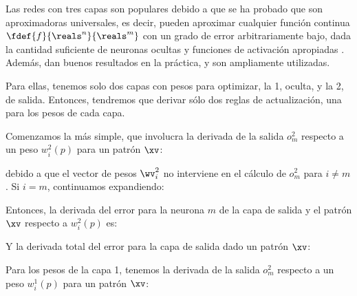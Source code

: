 Las redes con tres capas son populares debido a que se ha probado que son aproximadoras universales, es decir, pueden aproximar cualquier función continua  $\fdef{f}{\reals^n}{\reals^m}$ con un grado de error arbitrariamente bajo, dada la cantidad suficiente de neuronas ocultas y funciones de activación apropiadas \cite{haykin1994}. Además, dan buenos resultados en la práctica, y son ampliamente utilizadas. 

Para ellas, tenemos solo dos capas con pesos para optimizar, la 1, oculta, y la 2, de salida. Entonces, tendremos que derivar sólo dos reglas de actualización, una para los pesos de cada capa.

Comenzamos la más simple, que involucra la derivada de la salida $o_m^2$ respecto a un peso $w_i^2(p)$ para un patrón $\xv$:


debido a que el vector de pesos $\wv_i^2$ no interviene en el cálculo de $o_m^2$ para $i \neq m$. Si $i=m$, continuamos expandiendo:



Entonces, la derivada del error para la neurona $m$ de la capa de salida y el patrón $\xv$ respecto a $w_i^2(p)$ es:


Y la derivada total del error para la capa de salida dado un patrón $\xv$:


Para los pesos de la capa 1, tenemos la derivada de la salida $o_m^2$ respecto a un peso $w_i^1(p)$ para un patrón $\xv$:

